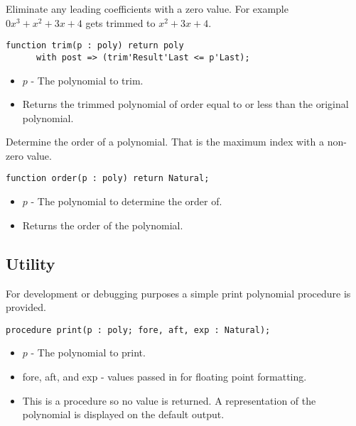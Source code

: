 \documentclass[10pt, openany]{book}
\begin{document}
Eliminate any leading coefficients with a zero value.  For example $0x^3+x^2+3x+4$ gets trimmed to $x^2+3x+4$.
\begin{lstlisting}
function trim(p : poly) return poly
      with post => (trim'Result'Last <= p'Last);
\end{lstlisting}
\begin{itemize}
  \item $p$ - The polynomial to trim.
  \item Returns the trimmed polynomial of order equal to or less than the original polynomial.
\end{itemize}

Determine the order of a polynomial.  That is the maximum index with a non-zero value.
\begin{lstlisting}
function order(p : poly) return Natural;
\end{lstlisting}
\begin{itemize}
  \item $p$ - The polynomial to determine the order of.
  \item Returns the order of the polynomial.
\end{itemize}

\subsection{Utility}
For development or debugging purposes a simple print polynomial procedure is provided.

\begin{lstlisting}
procedure print(p : poly; fore, aft, exp : Natural);
\end{lstlisting}
\begin{itemize}
  \item $p$ - The polynomial to print.
  \item fore, aft, and exp - values passed in for floating point formatting.
  \item This is a procedure so no value is returned.  A representation of the polynomial is displayed on the default output.
\end{itemize}
\end{document}
